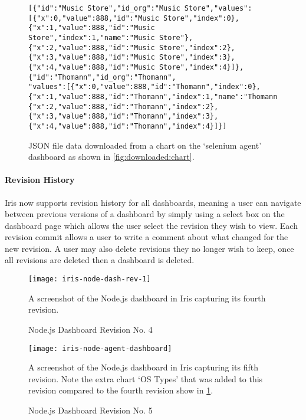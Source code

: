 \documentclass[12pt,a4paper,titlepage]{report}
\begin{document}
\begin{figure}[H]
\begin{tcolorbox}
\begin{verbatim}
[{"id":"Music Store","id_org":"Music Store","values":[{"x":0,"value":888,"id":"Music Store","index":0},{"x":1,"value":888,"id":"Music Store","index":1,"name":"Music Store"},{"x":2,"value":888,"id":"Music Store","index":2},{"x":3,"value":888,"id":"Music Store","index":3},{"x":4,"value":888,"id":"Music Store","index":4}]},{"id":"Thomann","id_org":"Thomann",
"values":[{"x":0,"value":888,"id":"Thomann","index":0},
{"x":1,"value":888,"id":"Thomann","index":1,"name":"Thomann"},
{"x":2,"value":888,"id":"Thomann","index":2},
{"x":3,"value":888,"id":"Thomann","index":3},
{"x":4,"value":888,"id":"Thomann","index":4}]}]
\end{verbatim}
\end{tcolorbox}
\caption{JSON file data downloaded from a chart on the  `selenium agent' dashboard as shown in \cref{fig:downloaded:chart}.}
\end{figure}

\paragraph{Revision History}

Iris now supports revision history for all dashboards, meaning a user can navigate between previous versions of a dashboard by simply using a select box on the dashboard page which allows the user select the revision they wish to view. Each revision commit allows a user to write a comment about what changed for the new revision. A user may also delete revisions they no longer wish to keep, once all revisions are deleted then a dashboard is deleted.
\begin{figure}[H]
\begin{tcolorbox}
\begin{center}
\texttt{[image: iris-node-dash-rev-1]}
\end{center}
A screenshot of the Node.js dashboard in Iris capturing its fourth revision.
\end{tcolorbox}
\caption{Node.js Dashboard Revision No. 4}
\label{fig:dash:rev:4}
\end{figure}
\begin{figure}[H]
\begin{tcolorbox}
\begin{center}
\texttt{[image: iris-node-agent-dashboard]}
\end{center}
A screenshot of the Node.js dashboard in Iris capturing its fifth revision. Note the extra chart `OS Types' that was added to this revision compared to the fourth revision show in \cref{fig:dash:rev:4}.
\end{tcolorbox}
\caption{Node.js Dashboard Revision No. 5}
\end{figure}
\end{document}
